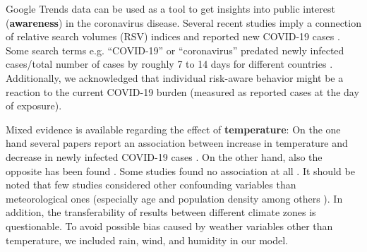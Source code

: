\documentclass[10pt,letterpaper]{article}
\begin{document}
Google Trends \cite{google_trends} data can be used as a tool to get
insights into public interest (\textbf{awareness}) in the coronavirus
disease. Several recent studies imply a connection of relative search
volumes (RSV) indices and reported new COVID-19 cases
\cite{ayyoubzadeh_predicting_2020, effenberger_association_2020, higgins_correlations_2020, li_retrospective_2020, lin_google_2020, mavragani_tracking_2020, walker_use_2020, yuan_trends_2020, zhou_effects_2020}.
Some search terms e.g. ``COVID-19'' or ``coronavirus'' predated newly
infected cases/total number of cases by roughly 7 to 14 days for
different countries
\cite{effenberger_association_2020, higgins_correlations_2020, li_retrospective_2020, yuan_trends_2020}.
Additionally, we acknowledged that individual risk-aware behavior might
be a reaction to the current COVID-19 burden (measured as reported cases
at the day of exposure).

Mixed evidence is available regarding the effect of
\textbf{temperature}: On the one hand several papers report an
association between increase in temperature and decrease in newly
infected COVID-19 cases
\cite{bannister-tyrrell_preliminary_2020, demongeot_temperature_2020, liu_impact_2020, qi_covid-19_2020, shi_impact_2020, sobral_association_2020, tosepu_correlation_2020, Wang2020temperature, wu_effects_2020}.
On the other hand, also the opposite has been found
\cite{auler_evidence_2020, xie_association_2020}. Some studies found no
association at all
\cite{briz-redon_spatio-temporal_2020, iqbal_nexus_2020, jahangiri_sensitivity_2020, juni_impact_2020, yao_no_2020}.
It should be noted that few studies considered other confounding
variables than meteorological ones (especially age and population
density among others
\cite{briz-redon_spatio-temporal_2020, juni_impact_2020, wu_effects_2020}).
In addition, the transferability of results between different climate
zones is questionable. To avoid possible bias caused by weather
variables other than temperature, we included rain, wind, and humidity
in our model.
\end{document}
